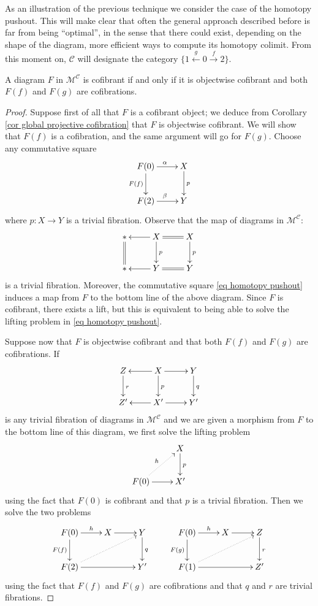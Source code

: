 \begin{refsection}
As an illustration of the previous technique we consider the case of the homotopy pushout. This will make clear that often the general approach described before is far from being ``optimal'', in the sense that there could exist, depending on the shape of the diagram, more efficient ways to compute its homotopy colimit. From this moment on, $\mathcal C$ will designate the category $\{1 \xleftarrow{g} 0 \xrightarrow{f} 2\}$.

\begin{lemma}
A diagram $F$ in $\mathcal M^{\mathcal C}$ is cofibrant if and only if it is objectwise cofibrant and both $F(f)$ and $F(g)$ are cofibrations.
\end{lemma}

\begin{proof}
Suppose first of all that $F$ is a cofibrant object; we deduce from Corollary \ref{cor global projective cofibration} that $F$ is objectwise cofibrant. We will show that $F(f)$ is a cofibration, and the same argument will go for $F(g)$. Choose any commutative square
\begin{equation} \label{eq homotopy pushout}
\xymatrix{
F(0) \ar[d]_{F(f)} \ar[r]^\alpha & X \ar[d]^p \\
F(2) \ar[r]^\beta & Y
}
\end{equation}
where $p \colon X \to Y$ is a trivial fibration. Observe that the map of diagrams in $\mathcal M^{\mathcal C}$:
\[
\xymatrix{
{*} \ar@{=}[d] & X \ar[l] \ar@{=}[r] \ar[d]^p & X \ar[d]^p \\
{*} & Y \ar[l] \ar@{=}[r] & Y
}
\]
is a trivial fibration. Moreover, the commutative square \eqref{eq homotopy pushout} induces a map from $F$ to the bottom line of the above diagram. Since $F$ is cofibrant, there exists a lift, but this is equivalent to being able to solve the lifting problem in \eqref{eq homotopy pushout}.

Suppose now that $F$ is objectwise cofibrant and that both $F(f)$ and $F(g)$ are cofibrations. If
\[
\xymatrix{
Z \ar[d]^r & X \ar[l] \ar[r] \ar[d]^p & Y \ar[d]^q \\
Z' & X' \ar[l] \ar[r] & Y'
}
\]
is any trivial fibration of diagrams in $\mathcal M^{\mathcal C}$ and we are given a morphism from $F$ to the bottom line of this diagram, we first solve the lifting problem
\[
\xymatrix{
& X \ar[d]^p \\
F(0) \ar@{.>}[ur]^h \ar[r] & X'
}
\]
using the fact that $F(0)$ is cofibrant and that $p$ is a trivial fibration. Then we solve the two problems
\[
\xymatrix{
F(0) \ar[d]_{F(f)} \ar[r]^-h & X \ar[r] & Y \ar[d]^q \\
F(2) \ar[rr] \ar@{.>}[urr] & & Y'
} \qquad \xymatrix{
F(0) \ar[d]_{F(g)} \ar[r]^-h & X \ar[r] & Z \ar[d]^r \\
F(1) \ar[rr] \ar@{.>}[urr] & & Z'
}
\]
using the fact that $F(f)$ and $F(g)$ are cofibrations and that $q$ and $r$ are trivial fibrations.
\end{proof}


\end{refsection}
